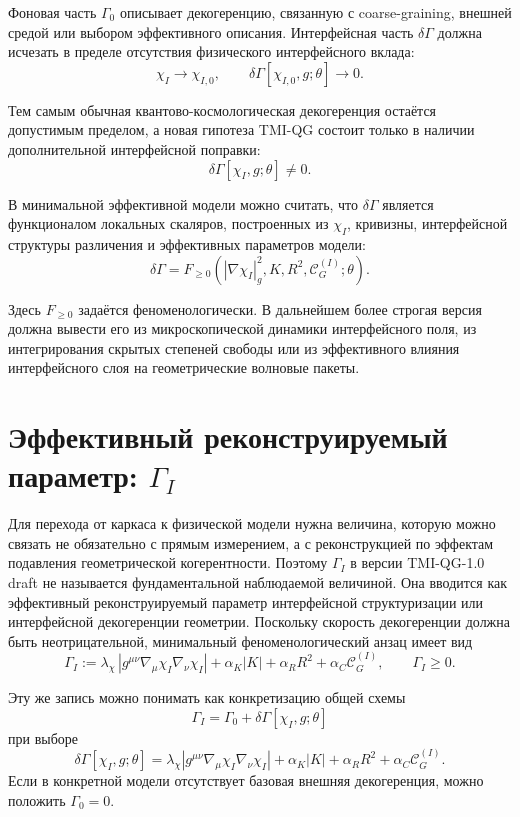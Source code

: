 \documentclass[12pt,a4paper]{article}
\begin{document}
Фоновая часть $\Gamma_0$ описывает декогеренцию, связанную с coarse-graining, внешней средой или выбором эффективного описания. Интерфейсная часть $\delta\Gamma$ должна исчезать в пределе отсутствия физического интерфейсного вклада:
\[
\boxed{
\chi_I\to\chi_{I,0},
\qquad
\delta\Gamma[\chi_{I,0},g;\theta]\to0.
}
\]

Тем самым обычная квантово-космологическая декогеренция остаётся допустимым пределом, а новая гипотеза TMI-QG состоит только в наличии дополнительной интерфейсной поправки:
\[
\boxed{
\delta\Gamma[\chi_I,g;\theta]\neq0.
}
\]

В минимальной эффективной модели можно считать, что $\delta\Gamma$ является функционалом локальных скаляров, построенных из $\chi_I$, кривизны, интерфейсной структуры различения и эффективных параметров модели:
\[
\boxed{
\delta\Gamma
=
F_{\ge0}
\left(
|\nabla\chi_I|_g^2,
K,
R^2,
\mathcal C_G^{(I)};\theta
\right).
}
\]

Здесь $F_{\ge0}$ задаётся феноменологически. В дальнейшем более строгая версия должна вывести его из микроскопической динамики интерфейсного поля, из интегрирования скрытых степеней свободы или из эффективного влияния интерфейсного слоя на геометрические волновые пакеты.

\section{Эффективный реконструируемый параметр: \texorpdfstring{$\Gamma_I$}{Gamma I}}

Для перехода от каркаса к физической модели нужна величина, которую можно связать не обязательно с прямым измерением, а с реконструкцией по эффектам подавления геометрической когерентности. Поэтому $\Gamma_I$ в версии TMI-QG-1.0 draft не называется фундаментальной наблюдаемой величиной. Она вводится как эффективный реконструируемый параметр интерфейсной структуризации или интерфейсной декогеренции геометрии. Поскольку скорость декогеренции должна быть неотрицательной, минимальный феноменологический анзац имеет вид
\[
\boxed{
\Gamma_I
:=
\lambda_\chi\,\left|g^{\mu\nu}\nabla_\mu\chi_I\nabla_\nu\chi_I\right|
+
\alpha_K |K|
+
\alpha_R R^2
+
\alpha_C\mathcal C_G^{(I)},
\qquad
\Gamma_I\ge0.
}
\]

Эту же запись можно понимать как конкретизацию общей схемы
\[
\boxed{
\Gamma_I
=
\Gamma_0
+
\delta\Gamma[\chi_I,g;\theta]
}
\]
при выборе
\[
\boxed{
\delta\Gamma[\chi_I,g;\theta]
=
\lambda_\chi\left|g^{\mu\nu}\nabla_\mu\chi_I\nabla_\nu\chi_I\right|
+
\alpha_K |K|
+
\alpha_R R^2
+
\alpha_C\mathcal C_G^{(I)}.
}
\]
Если в конкретной модели отсутствует базовая внешняя декогеренция, можно положить $\Gamma_0=0$.
\end{document}
